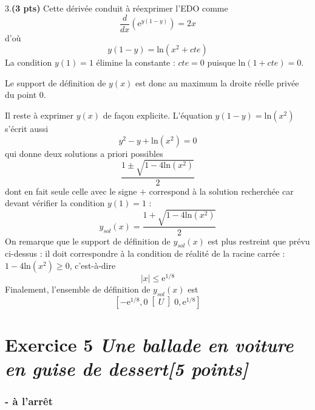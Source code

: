 \documentclass[fleqn]{article}
\begin{document}
{3.\textbf{(3 pts)} Cette dérivée conduit à réexprimer l'EDO comme
\[
\frac{d}{dx}\left(\textrm{e}^{y\left(1-y\right)}\right)=2x
\]
d'où
\[
y\left(1-y\right)=\textrm{ln}\left(x^{2}+cte\right)
\]
La condition $y\left(1\right)=1$ élimine la constante : $cte=0$
puisque $\textrm{ln}\left(1+cte\right)=0$.}

{Le support de définition de $y\left(x\right)$ est
donc au maximum la droite réelle privée du point $0$.}

{Il reste à exprimer $y\left(x\right)$ de façon explicite.
L'équation $y\left(1-y\right)=\textrm{ln}\left(x^{2}\right)$ s'écrit
aussi
\[
y^{2}-y+\textrm{ln}\left(x^{2}\right)=0
\]
qui donne deux solutions a priori possibles
\[
\frac{1\pm\sqrt{1-4\textrm{ln}\left(x^{2}\right)}}{2}
\]
dont en fait seule celle avec le signe $+$ correspond à la solution
recherchée car devant vérifier la condition $y\left(1\right)=1$ :
\[
y_{sol}\left(x\right)=\frac{1+\sqrt{1-4\textrm{ln}\left(x^{2}\right)}}{2}
\]
On remarque que le support de définition de $y_{sol}\left(x\right)$
est plus restreint que prévu ci-dessus : il doit correspondre à la
condition de réalité de la racine carrée : $1-4\textrm{ln}\left(x^{2}\right)\geq0$,
c'est-à-dire 
\[
\left|x\right|\leq\textrm{e}^{1/8}
\]
Finalement, l'ensemble de définition de $y_{sol}\left(x\right)$ est
\[
\left[-\textrm{e}^{1/8},0\right[U\left]0,\textrm{e}^{1/8}\right]
\]
}
\section{Exercice 5 \textit{\normalsize{Une ballade en voiture en guise de dessert}{[}5 points{]}}}
\subsubsection*{- \`a l'arr\^et }
\end{document}
